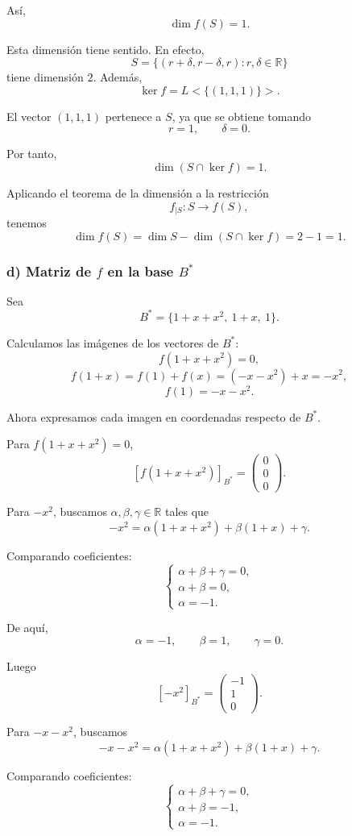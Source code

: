 \documentclass[12pt]{article}
\begin{document}
Así,
\[
\boxed{\dim f(S)=1.}
\]

Esta dimensión tiene sentido. En efecto,
\[
S=\{(r+\delta,r-\delta,r):r,\delta\in\mathbb{R}\}
\]
tiene dimensión \(2\). Además,
\[
\ker f=L<\{(1,1,1)\}>.
\]

El vector \((1,1,1)\) pertenece a \(S\), ya que se obtiene tomando
\[
r=1,
\qquad
\delta=0.
\]

Por tanto,
\[
\dim(S\cap\ker f)=1.
\]

Aplicando el teorema de la dimensión a la restricción
\[
f_{\mid S}:S\longrightarrow f(S),
\]
tenemos
\[
\dim f(S)=\dim S-\dim(S\cap\ker f)=2-1=1.
\]

\subsubsection*{d) Matriz de \(f\) en la base \(B^*\)}

Sea
\[
B^*=\{1+x+x^2,\ 1+x,\ 1\}.
\]

Calculamos las imágenes de los vectores de \(B^*\):
\[
f(1+x+x^2)=0,
\]
\[
f(1+x)=f(1)+f(x)=(-x-x^2)+x=-x^2,
\]
\[
f(1)=-x-x^2.
\]

Ahora expresamos cada imagen en coordenadas respecto de \(B^*\).

Para \(f(1+x+x^2)=0\),
\[
[f(1+x+x^2)]_{B^*}=
\begin{pmatrix}
0\\0\\0
\end{pmatrix}.
\]

Para \(-x^2\), buscamos \(\alpha,\beta,\gamma\in\mathbb{R}\) tales que
\[
-x^2=\alpha(1+x+x^2)+\beta(1+x)+\gamma.
\]

Comparando coeficientes:
\[
\begin{cases}
\alpha+\beta+\gamma=0,\\
\alpha+\beta=0,\\
\alpha=-1.
\end{cases}
\]

De aquí,
\[
\alpha=-1,
\qquad
\beta=1,
\qquad
\gamma=0.
\]

Luego
\[
[-x^2]_{B^*}=
\begin{pmatrix}
-1\\1\\0
\end{pmatrix}.
\]

Para \(-x-x^2\), buscamos
\[
-x-x^2=\alpha(1+x+x^2)+\beta(1+x)+\gamma.
\]

Comparando coeficientes:
\[
\begin{cases}
\alpha+\beta+\gamma=0,\\
\alpha+\beta=-1,\\
\alpha=-1.
\end{cases}
\]
\end{document}
